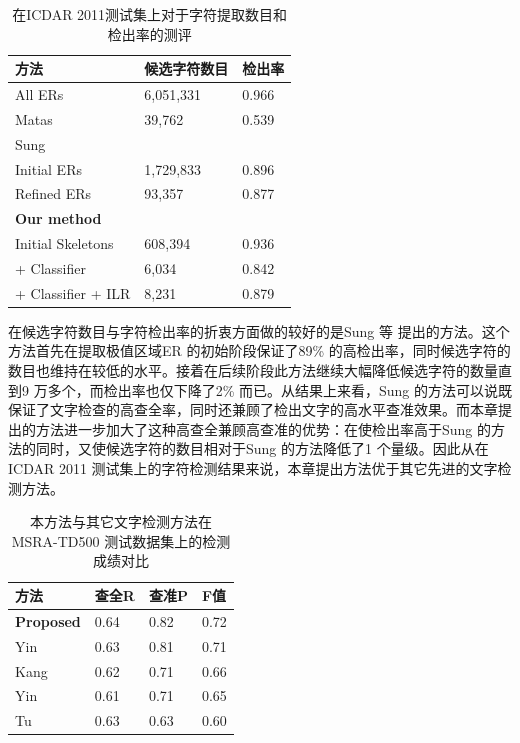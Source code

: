         \begin{table}[htbp]
        \centering
        \caption{在ICDAR 2011测试集上对于字符提取数目和检出率的测评}
        \begin{tabular}{p{}|p{} p{}}
        \hline
        方法 & 候选字符数目 & 检出率 \\
        \hline
        All ERs & 6,051,331 & 0.966 \\
        \hline
        Matas\cite{Matas2004Robust} & 39,762 & 0.539 \\
        \hline
        Sung\cite{Sung2015Scene} &  &  \\
        Initial ERs & 1,729,833 & 0.896 \\
        Refined ERs & 93,357 & 0.877 \\
        \hline
        \textbf{Our method}  &  &  \\
        Initial Skeletons & 608,394 & 0.936 \\
        + Classifier & 6,034 & 0.842 \\
         + Classifier + ILR & 8,231 & 0.879 \\
        \hline
        \end{tabular}
        \label{tab.c3_icdar11}
        \end{table}

        在候选字符数目与字符检出率的折衷方面做的较好的是Sung 等\cite{Sung2015Scene} 提出的方法。这个方法首先在提取极值区域ER 的初始阶段保证了89\% 的高检出率，同时候选字符的数目也维持在较低的水平。接着在后续阶段此方法继续大幅降低候选字符的数量直到9 万多个，而检出率也仅下降了2\% 而已。从结果上来看，Sung 的方法可以说既保证了文字检查的高查全率，同时还兼顾了检出文字的高水平查准效果。而本章提出的方法进一步加大了这种高查全兼顾高查准的优势：在使检出率高于Sung 的方法的同时，又使候选字符的数目相对于Sung 的方法降低了1 个量级。因此从在ICDAR 2011 测试集上的字符检测结果来说，本章提出方法优于其它先进的文字检测方法。

        \begin{table}[!h]
        \centering
        \caption{ 本方法与其它文字检测方法在MSRA-TD500 测试数据集上的检测成绩对比}
        \begin{tabular}{p{}|p{} p{} p{}}
        \hline
        方法 & 查全R & 查准P & F值 \\
        \hline
        \textbf{Proposed} & 0.64 & 0.82 & 0.72 \\
        Yin\cite{Yin2015Multi} & 0.63 & 0.81 & 0.71 \\
        Kang\cite{Kang2014Orientation} & 0.62 & 0.71 & 0.66 \\
        Yin\cite{Yin2013Robust} & 0.61 & 0.71 & 0.65 \\
        Tu\cite{Tu2012Detecting} & 0.63 & 0.63 & 0.60\\
        \hline
        \end{tabular}
        \label{tab.c3_msra}
        \end{table}

